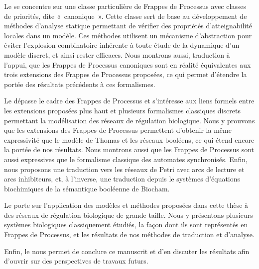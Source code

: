 Le  se concentre sur une classe particulière de Frappes de Processus avec classes
de priorités, dite «~canonique~».
Cette classe sert de base au développement de méthodes d'analyse statique permettant
de vérifier des propriétés d'atteignabilité locales dans un modèle.
Ces méthodes utilisent un mécanisme d'abstraction pour éviter l'explosion combinatoire
inhérente à toute étude de la dynamique d'un modèle discret, et ainsi rester efficaces.
Nous montrons aussi, traduction à l'appui,
que les Frappes de Processus canoniques sont en réalité équivalentes
aux trois extensions des Frappes de Processus proposées,
ce qui permet d'étendre la portée des résultats précédents à ces formalismes.

Le  dépasse le cadre des Frappes de Processus et s'intéresse aux liens
formels entre les extensions proposées plus haut et plusieurs formalismes classiques discrets
permettant la modélisation des réseaux de régulation biologique.
Nous y prouvons que les extensions des Frappes de Processus permettent d'obtenir la même
expressivité que le modèle de Thomas et les réseaux booléens,
ce qui étend encore la portée de nos résultats.
Nous montrons aussi que les Frappes de Processus sont aussi expressives que le
formalisme classique des automates synchronisés.
Enfin, nous proposons une traduction vers les réseaux de Petri
avec arcs de lecture et arcs inhibiteurs,
et, à l'inverse, une traduction depuis le systèmes d'équations biochimiques
de la sémantique booléenne de Biocham.

Le  porte sur l'application des modèles et méthodes proposées
dans cette thèse à des réseaux de régulation biologique de grande taille.
Nous y présentons plusieurs systèmes biologiques classiquement étudiés,
la façon dont ils sont représentés en Frappes de Processus,
et les résultats de nos méthodes de traduction et d'analyse.

Enfin, le  nous permet de conclure ce manuscrit
et d'en discuter les résultats afin d'ouvrir sur des perspectives de travaux futurs.
